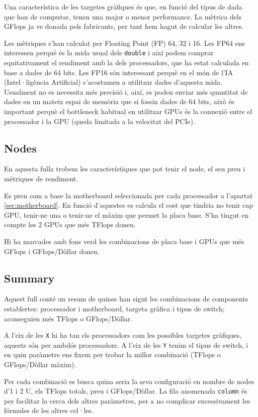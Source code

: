 Una característica de les targetes gràfiques és que, en funció del tipus de dada que han de computar, tenen una major o menor performance. La mètrica dels GFlops ja ve donada pels fabricants, per tant hem hagut de calcular les altres. 

Les mètriques s'han calculat per Floating Point (FP) 64, 32 i 16.
Les FP64 ens interessen perquè és la mida usual dels \texttt{double} i així podem comprar equitativament el rendiment amb la dels processadors, que ha estat calculada en base a dades de 64 bits.
Les FP16 són interessant perquè en el món de l'IA (Intel·ligència Artificial) s'acostumen a utilitzar dades d'aquesta mida. Usualment no es necessita més precisió i, així, es poden enviar més quantitat de dades en un mateix espai de memòria que si fossin dades de 64 bits, això és important perquè el bottleneck habitual en utilitzar GPUs és la connexió entre el processador i la GPU (queda limitada a la velocitat del PCIe).

\subsection{Nodes}
En aquesta fulla trobem les característiques que pot tenir el node, el seu preu i mètriques de rendiment.

Es pren com a base la motherboard seleccionada per cada processador a l'apartat \ref{sec:motherboard}. En funció d'aquestes es calcula el cost que tindria no tenir cap GPU, tenir-ne una o tenir-ne el màxim que permet la placa base. S'ha tingut en compte les 2 GPUs que més TFlops donen.

Hi ha marcades amb fons verd les combinacions de placa base i GPUs que més GFlops i GFlops/Dòllar donen.

\subsection{Summary}
Aquest full conté un resum de quines han sigut les combinacions de components establertes: processador i motherboard, targeta gràfica i tipus de switch; aconseguien més TFlops o GFlops/Dòllar.

A l'eix de les \texttt{X} hi ha tan els processadors com les possibles targetes gràfiques, aquests són per ambdós processadors. A l'eix de les \texttt{Y} tenim el tipus de switch, i en quin paràmetre ens fixem per trobar la millor combinació (TFlops o GFlops/Dòllar màxim).

Per cada combinació es busca quina seria la seva configuració en nombre de nodes d'1 i 2 U, els TFlops totals, preu i GFlops/Dòllar. La fila anomenada \texttt{column} és per facilitar la cerca dels altres paràmetres, per a no complicar excessivament les fórmules de les altres cel·les.


